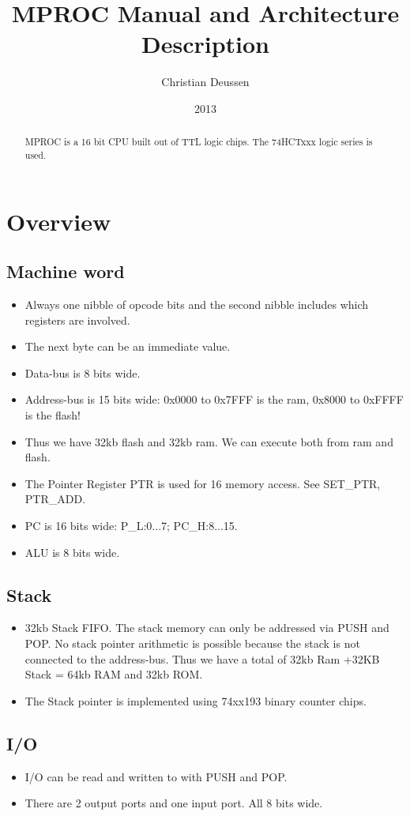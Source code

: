 \documentclass[a4paper, 12pt]{article}
\title{MPROC Manual and Architecture Description}
\author{Christian Deussen}
\date{2013}
\begin{document}
	\maketitle
	\begin{abstract}
	MPROC is a 16 bit CPU built out of TTL logic chips. The 74HCTxxx logic series is used.
	\end{abstract}
	\tableofcontents
	\newpage
	\section{Overview}
	\subsection {Machine word}
	\begin{itemize}
		\item Always one nibble of opcode bits and the second nibble includes which registers are involved.
		\item The next byte can be an immediate value.
		\item Data-bus is 8 bits wide.
		\item Address-bus is 15 bits wide: 0x0000 to 0x7FFF is the ram, 0x8000 to 0xFFFF is the flash! 
		\item Thus we have 32kb flash and 32kb ram. We can execute both from ram and flash.
		\item The Pointer Register PTR is used for 16 memory access. See SET\_PTR, PTR\_ADD.
		\item PC is 16 bits wide: P\_L:0...7; PC\_H:8...15.
		\item ALU is 8 bits wide.
	\end{itemize}

	\subsection {Stack}
	\begin{itemize}
		\item 32kb Stack FIFO. The stack memory can only be addressed via PUSH and POP. No stack pointer arithmetic is possible because the stack is not connected to the address-bus.
			Thus we have a total of 32kb Ram +32KB Stack = 64kb RAM and 32kb ROM.
		\item The Stack pointer is implemented using 74xx193 binary counter chips. 
	\end{itemize}

	\subsection{I/O}
	\begin{itemize}
		\item I/O can be read and written to with PUSH and POP. 
		\item There are 2 output ports and one input port. All 8 bits wide.
	\end{itemize}
\end{document}
